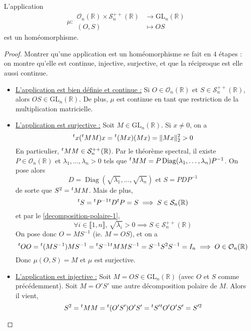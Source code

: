 
	\begin{theorem}
		L'application
		\[ \mu :
		\begin{array}{cl}
			\mathcal{O}_n(\mathbb{R}) \times \mathcal{S}_n^{++}(\mathbb{R}) & \rightarrow \mathrm{GL}_n(\mathbb{R}) \\
			(O, S) & \mapsto OS
		\end{array}
		\]
		est un homéomorphisme.
	\end{theorem}

	\begin{proof}
		Montrer qu'une application est un homéomorphisme se fait en $4$ étapes : on montre qu'elle est continue, injective, surjective, et que la réciproque est elle aussi continue.
		\begin{itemize}
			\item \uline{L'application est bien définie et continue :} Si $O \in \mathcal{O}_n(\mathbb{R})$ et $S \in \mathcal{S}_n^{++}(\mathbb{R})$, alors $OS \in \mathrm{GL}_n(\mathbb{R})$. De plus, $\mu$ est continue en tant que restriction de la multiplication matricielle.
			\item \uline{L'application est surjective :} Soit $M \in \mathrm{GL}_n(\mathbb{R})$. Si $x \neq 0$, on a
			\[ \mathstrut ^t x (\mathstrut ^t M M) x = \mathstrut ^t (Mx) (Mx) = \Vert Mx \Vert_2^2 > 0 \]
			En particulier, $\mathstrut ^t M M \in \mathcal{S}_n^{++}(\mathbb{R})$. Par le théorème spectral, il existe $P \in \mathcal{O}_n(\mathbb{R})$ et $\lambda_1, \dots, \lambda_n > 0$ tels que $\mathstrut ^t M M = P \operatorname{Diag}(\lambda_1, \dots, \lambda_n) P^{-1}$. On pose alors
			\[ D = \operatorname{Diag} \left(\sqrt{\lambda_1}, \dots, \sqrt{\lambda_n} \right) \text{ et } S = P D P^{-1} \]
			de sorte que $S^2 = \mathstrut ^t M M$. Mais de plus,
			\[ \mathstrut ^t S = \mathstrut ^t P^{-1} \mathstrut ^t D \mathstrut ^t P = S \implies S \in \mathcal{S}_n(\mathbb{R}) \]
			et par le \cref{decomposition-polaire-1},
			\[ \forall i \in \llbracket 1, n \rrbracket, \, \sqrt{\lambda_i} > 0 \implies S \in \mathcal{S}_n^{++}(\mathbb{R}) \]
			On pose donc $O = MS^{-1}$ (ie. $M = OS$), et on a
			\[ \mathstrut ^t O O = \mathstrut ^t (MS^{-1}) MS^{-1} = \mathstrut ^t S^{-1} \mathstrut ^t M M S^{-1} = S^{-1} S^2 S^{-1} = I_n \implies O \in \mathcal{O}_n(\mathbb{R}) \]
			Donc $\mu(O, S) = M$ et $\mu$ est surjective.
			\item \uline{L'application est injective :} Soit $M = OS \in \mathrm{GL}_n(\mathbb{R})$ (avec $O$ et $S$ comme précédemment). Soit $M = O'S'$ une autre décomposition polaire de $M$. Alors il vient,
			\[ S^2 = \mathstrut ^t M M = \mathstrut ^t (O'S') O'S' = \mathstrut ^t S' \mathstrut ^t O' O' S' = S'^{2} \]

\end{itemize}
\end{proof}
